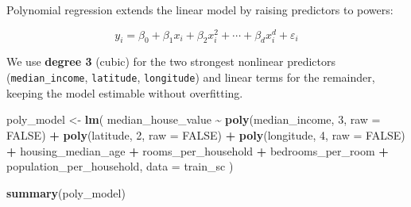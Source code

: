 \documentclass[
]{article}
\newenvironment{Shaded}{\begin{snugshade}}{\end{snugshade}}
\newcommand{\AttributeTok}[1]{\textcolor[rgb]{0.13,0.29,0.53}{#1}}
\newcommand{\ConstantTok}[1]{\textcolor[rgb]{0.56,0.35,0.01}{#1}}
\newcommand{\DecValTok}[1]{\textcolor[rgb]{0.00,0.00,0.81}{#1}}
\newcommand{\FunctionTok}[1]{\textcolor[rgb]{0.13,0.29,0.53}{\textbf{#1}}}
\newcommand{\NormalTok}[1]{#1}
\newcommand{\OtherTok}[1]{\textcolor[rgb]{0.56,0.35,0.01}{#1}}
\newcommand{\SpecialCharTok}[1]{\textcolor[rgb]{0.81,0.36,0.00}{\textbf{#1}}}
\begin{document}
Polynomial regression extends the linear model by raising predictors to
powers:

\[y_i = \beta_0 + \beta_1 x_i + \beta_2 x_i^2 + \cdots + \beta_d x_i^d + \varepsilon_i\]

We use \textbf{degree 3} (cubic) for the two strongest nonlinear
predictors (\texttt{median\_income}, \texttt{latitude},
\texttt{longitude}) and linear terms for the remainder, keeping the
model estimable without overfitting.

\begin{Shaded}
\begin{Highlighting}[]
\NormalTok{poly\_model }\OtherTok{\textless{}{-}} \FunctionTok{lm}\NormalTok{(}
\NormalTok{  median\_house\_value }\SpecialCharTok{\textasciitilde{}}
    \FunctionTok{poly}\NormalTok{(median\_income, }\DecValTok{3}\NormalTok{, }\AttributeTok{raw =} \ConstantTok{FALSE}\NormalTok{) }\SpecialCharTok{+}
    \FunctionTok{poly}\NormalTok{(latitude,      }\DecValTok{2}\NormalTok{, }\AttributeTok{raw =} \ConstantTok{FALSE}\NormalTok{) }\SpecialCharTok{+}
    \FunctionTok{poly}\NormalTok{(longitude,     }\DecValTok{4}\NormalTok{, }\AttributeTok{raw =} \ConstantTok{FALSE}\NormalTok{) }\SpecialCharTok{+}
\NormalTok{    housing\_median\_age }\SpecialCharTok{+}
\NormalTok{    rooms\_per\_household }\SpecialCharTok{+}\NormalTok{ bedrooms\_per\_room }\SpecialCharTok{+}
\NormalTok{    population\_per\_household,}
  \AttributeTok{data =}\NormalTok{ train\_sc}
\NormalTok{)}

\FunctionTok{summary}\NormalTok{(poly\_model)}
\end{Highlighting}
\end{Shaded}
\end{document}
